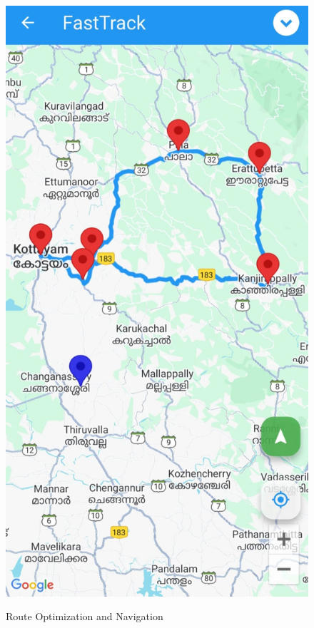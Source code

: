 \begin{figure}[H]
\hspace{5mm}
\begin{minipage}{0.24\textwidth}
    \centering
    \includegraphics[width=\linewidth]{4/Route_Optimization1.jpg}
    \label{fig:route_optimization1}
\end{minipage}
\caption{Route Optimization and Navigation}
\label{fig:route_optimization_combined}
\end{figure}
